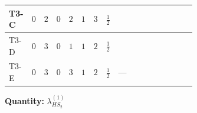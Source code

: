 \documentclass[8pt]{article}
\begin{document}
\begin{landscape}
\begin{longtable}{@{}llcccccc >{\raggedright\arraybackslash}p{0.21\linewidth} >{\raggedright\arraybackslash}p{0.21\linewidth} >{\raggedright\arraybackslash}p{0.21\linewidth}@{}}
\midrule
T3-C & $0$ & $2$ & $0$ & $2$ & $1$ & $3$ & $\frac{1}{2}$ & \scriptsize\adjustbox{max width=\linewidth}{$\begin{gathered} +4 {\lambda_{12}^{(1)}} {\lambda_{HS_1}^{(1)}}\end{gathered}$} & \scriptsize\adjustbox{max width=\linewidth}{$\begin{gathered} +6 {\lambda_1} {\lambda_{HS_2}^{(1)}}\end{gathered}$} & \scriptsize\adjustbox{max width=\linewidth}{$\begin{gathered} +4 {\lambda_{HS_2}^{(1)}}^2\end{gathered}$} \\
\midrule
T3-D & $0$ & $3$ & $0$ & $1$ & $1$ & $2$ & $\frac{1}{2}$ & \scriptsize\adjustbox{max width=\linewidth}{$\begin{gathered} +6 {\lambda_{12}^{(1)}} {\lambda_{HS_1}^{(1)}}\end{gathered}$} & \scriptsize\adjustbox{max width=\linewidth}{$\begin{gathered} +6 {\lambda_1} {\lambda_{HS_2}^{(1)}}\end{gathered}$} & \scriptsize\adjustbox{max width=\linewidth}{$\begin{gathered} +4 {\lambda_{HS_2}^{(1)}}^2\end{gathered}$} \\
\midrule
T3-E & $0$ & $3$ & $0$ & $3$ & $1$ & $2$ & $\frac{1}{2}$ & --- & \scriptsize\adjustbox{max width=\linewidth}{$\begin{gathered} +6 {\lambda_1} {\lambda_{HS_2}^{(1)}}\end{gathered}$} & \scriptsize\adjustbox{max width=\linewidth}{$\begin{gathered} +4 {\lambda_{HS_2}^{(1)}}^2\end{gathered}$} \\
\midrule
\bottomrule
\end{longtable}
\clearpage
\noindent\textbf{Quantity: }$\lambda_{HS_2}^{(1)}$\par\smallskip

\end{landscape}
\end{document}
